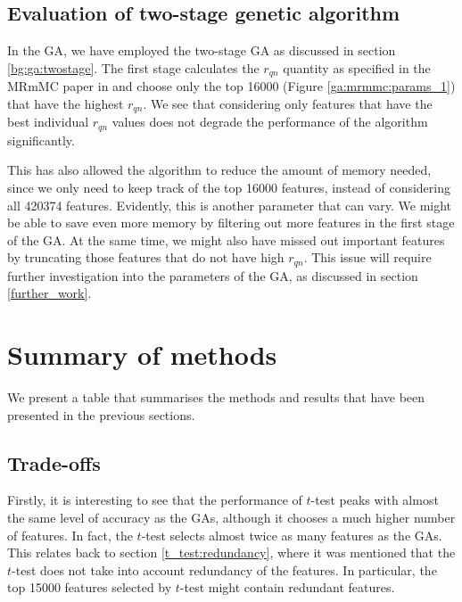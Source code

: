 \documentclass[12pt, twoside, a4paper]{report}
\begin{document}
\subsection{Evaluation of two-stage genetic algorithm}

In the GA, we have employed the two-stage GA as discussed in section \ref{bg:ga:twostage}. The first stage calculates the $r_{qn}$ quantity as specified in the MRmMC paper in \cite{RefWorks:187} and choose only the top 16000 (Figure \ref{ga:mrmmc:params_1}) that have the highest $r_{qn}$. We see that considering only features that have the best individual $r_{qn}$ values does not degrade the performance of the algorithm significantly.

This has also allowed the algorithm to reduce the amount of memory needed, since we only need to keep track of the top 16000 features, instead of considering all 420374 features. Evidently, this is another parameter that can vary. We might be able to save even more memory by filtering out more features in the first stage of the GA. At the same time, we might also have missed out important features by truncating those features that do not have high $r_{qn}$. This issue will require further investigation into the parameters of the GA, as discussed in section \ref{further_work}.


\section{Summary of methods}

We present a table that summarises the methods and results that have been presented in the previous sections.

\subsection{Trade-offs}

Firstly, it is interesting to see that the performance of $t$-test peaks with almost the same level of accuracy as the GAs, although it chooses a much higher number of features. In fact, the $t$-test selects almost twice as many features as the GAs. This relates back to section \ref{t_test:redundancy}, where it was mentioned that the $t$-test does not take into account redundancy of the features. In particular, the top 15000 features selected by $t$-test might contain redundant features.

\end{document}

